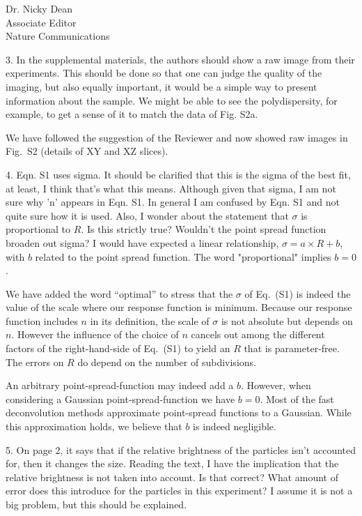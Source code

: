 \documentclass[a4paper, rebuttal, parskip=true, firsthead=false, fromemail=true, foldmarks=false]{scrlttr2}
\begin{document}
\begin{letter}{Dr. Nicky Dean\\
Associate Editor\\
Nature Communications}
\begin{quotationi}
3. In the supplemental materials, the authors should show a raw image from their experiments. This should be done so that one can judge the quality of the imaging, but also equally important, it would be a simple way to present information about the sample. We might be able to see the polydispersity, for example, to get a sense of it to match the data of Fig. S2a.
\end{quotationi}
We have followed the suggestion of the Reviewer and now showed raw images in Fig.~S2 (details of XY and XZ slices). 

\begin{quotationi}
4. Eqn. S1 uses sigma. It should be clarified that this is the sigma of the best fit, at least, I think that's what this means. Although given that sigma, I am not sure why 'n' appears in Eqn. S1. In general I am confused by Eqn. S1 and not quite sure how it is used. Also, I wonder about the statement that $\sigma$ is proportional to $R$. Is this strictly true? Wouldn't the point spread function broaden out sigma? I would have expected a linear relationship, $\sigma = a\times R + b$, with $b$ related to the point spread function. The word "proportional" implies $b=0$.
\end{quotationi}

We have added the word ``optimal'' to stress that the $\sigma$ of Eq.~(S1) is indeed the value of the scale where our response function is minimum. Because our response function includes $n$ in its definition, the scale of $\sigma$ is not absolute but depends on $n$. However the influence of the choice of $n$ cancels out among the different factors of the right-hand-side of Eq.~(S1) to yield an $R$ that is parameter-free. The errors on $R$ do depend on the number of subdivisions.

An arbitrary point-spread-function may indeed add a $b$. However, when considering a Gaussian point-spread-function we have $b=0$. Most of the fast deconvolution methods approximate point-spread functions to a Gaussian. While this approximation holds, we believe that $b$ is indeed negligible.


\begin{quotationi}
5. On page 2, it says that if the relative brightness of the particles isn't accounted for, then it changes the size. Reading the text, I have the implication that the relative brightness is not taken into account. Is that correct? What amount of error does this introduce for the particles in this experiment? I assume it is not a big problem, but this should be explained.
\end{quotationi}


\end{letter}
\end{document}
